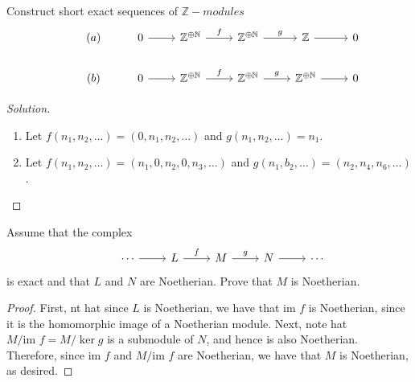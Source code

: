 \documentclass[12pt]{article}
\newenvironment{problem}[2][Problem]{\begin{trivlist}
\item[\hskip \labelsep {\bfseries #1}\hskip \labelsep {\bfseries #2.}]}{\end{trivlist}}
\newcommand{\im}{\text{im }}
\newcommand{\N}{\mathbb{N}}
\newcommand{\Z}{\mathbb{Z}}
\newenvironment{solution}
  {\renewcommand\qedsymbol{$\blacksquare$}\begin{proof}[Solution]}
{\end{proof}}
\theoremstyle{remark}
\begin{document}
\begin{problem}{7.4}
  Construct short exact sequences of $\Z-modules$
  \[
    \begin{tikzcd}
      &(a) &0 \ar[r] &\Z^{\oplus\N} \ar[r,"f"] &\Z^{\oplus\N} \ar[r,"g"] &\Z \ar[r] &0 \\
      &(b) &0 \ar[r] &\Z^{\oplus\N} \ar[r,"f"] &\Z^{\oplus\N} \ar[r,"g"] &\Z^{\oplus\N} \ar[r] &0
    \end{tikzcd}
  \]
\end{problem}
\begin{solution}\ 
  \begin{enumerate}[label=(\alph*)]
    \item Let $f(n_1,n_2,\dots)=(0,n_1,n_2,\dots)$ and $g(n_1,n_2,\dots)=n_1$.
    \item Let $f(n_1,n_2,\dots)=(n_1,0,n_2,0,n_3,\dots)$ and $g(n_1,b_2,\dots)=(n_2,n_4,n_6,\dots)$.
  \end{enumerate}
\end{solution}

\begin{problem}{7.5}
  Assume that the complex
  \[
    \begin{tikzcd}
      &\cdots \ar[r] &L \ar[r,"f"] &M \ar[r,"g"] &N \ar[r] &\cdots
    \end{tikzcd}
  \]
  is exact and that $L$ and $N$ are Noetherian.
  Prove that $M$ is Noetherian.
\end{problem}
\begin{proof}
  First, nt hat since $L$ is Noetherian, we have that $\im f$ is Noetherian, since it is the 
  homomorphic image of a Noetherian module.
  Next, note hat $M/\im f=M/\ker g$ is a submodule of $N$, and hence is also Noetherian. \\
  \indent Therefore, since $\im f$ and $M/\im f$ are Noetherian, we have that $M$ is Noetherian,
  as desired.
\end{proof}
\end{document}
